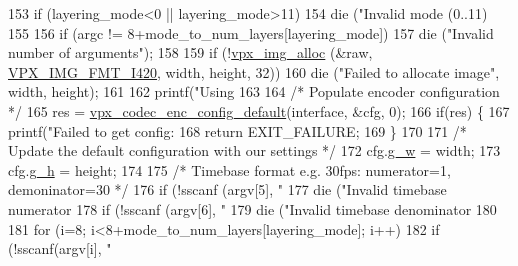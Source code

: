 \begin{DoxyCodeInclude}
{{{{{{153     \textcolor{keywordflow}{if} (layering\_mode<0 || layering\_mode>11)
154         die (\textcolor{stringliteral}{"Invalid mode (0..11) %
155 
156     \textcolor{keywordflow}{if} (argc != 8+mode\_to\_num\_layers[layering\_mode])
157         die (\textcolor{stringliteral}{"Invalid number of arguments"});
158 
159     \textcolor{keywordflow}{if} (!\hyperlink{vpx__image_8h_ab80398f28ca880368a922fa979eb66c1}{vpx\_img\_alloc} (&raw, \hyperlink{vpx__image_8h_a7a30a7bff7400fb83ad45fede5077193af17ce49c9a6efd7c8c8ea8928d4ce26c}{VPX\_IMG\_FMT\_I420}, width, height, 32))
160         die (\textcolor{stringliteral}{"Failed to allocate image"}, width, height);
161 
162     printf(\textcolor{stringliteral}{"Using %
163 
164     \textcolor{comment}{/* Populate encoder configuration */}
165     res = \hyperlink{group__encoder_ga9ab8c79623312e9c5d5405d66a788f59}{vpx\_codec\_enc\_config\_default}(interface, &cfg, 0);
166     \textcolor{keywordflow}{if}(res) \{
167         printf(\textcolor{stringliteral}{"Failed to get config: %
168         \textcolor{keywordflow}{return} EXIT\_FAILURE;
169     \}
170 
171     \textcolor{comment}{/* Update the default configuration with our settings */}
172     cfg.\hyperlink{structvpx__codec__enc__cfg_a5c165f5b41ca1158f2883983a2b7709c}{g\_w} = width;
173     cfg.\hyperlink{structvpx__codec__enc__cfg_a4132bd89ce85bce7c08f2cc3b6f2b82e}{g\_h} = height;
174 
175     \textcolor{comment}{/* Timebase format e.g. 30fps: numerator=1, demoninator=30 */}
176     \textcolor{keywordflow}{if} (!sscanf (argv[5], \textcolor{stringliteral}{"%
177         die (\textcolor{stringliteral}{"Invalid timebase numerator %
178     \textcolor{keywordflow}{if} (!sscanf (argv[6], \textcolor{stringliteral}{"%
179         die (\textcolor{stringliteral}{"Invalid timebase denominator %
180 
181     \textcolor{keywordflow}{for} (i=8; i<8+mode\_to\_num\_layers[layering\_mode]; i++)
182         \textcolor{keywordflow}{if} (!sscanf(argv[i], \textcolor{stringliteral}{"%
}}}}}}}}}}}}}}
\end{DoxyCodeInclude}
